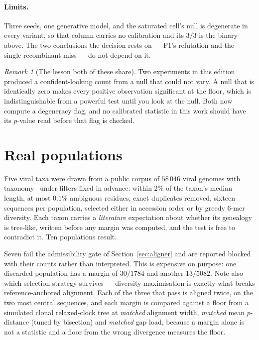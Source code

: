 \documentclass[11pt,a4paper]{article}
\theoremstyle{definition}
\theoremstyle{remark}
\newtheorem{remark}{Remark}[section]
\begin{document}
\paragraph{Limits.} Three seeds, one generative model, and the saturated cell's
null is degenerate in every variant, so that column carries no calibration and
its $3/3$ is the binary above. The two conclusions the decision rests on --- F1's
refutation and the single-recombinant miss --- do not depend on it.

\begin{remark}[The lesson both of these share]
Two experiments in this edition produced a confident-looking count from a null
that could not vary. A null that is identically zero makes every positive
observation significant at the floor, which is indistinguishable from a powerful
test until you look at the null. Both now compute a degeneracy flag, and no
calibrated statistic in this work should have its $p$-value read before that flag
is checked.
\end{remark}

\section{Real populations}\label{sec:real}

Five viral taxa were drawn from a public corpus of $58\,046$ viral genomes with
taxonomy~\cite{vhg} under filters fixed in advance: within $2\%$ of the taxon's
median length, at most $0.1\%$ ambiguous residues, exact duplicates removed,
sixteen sequences per population, selected either in accession order or by greedy
$6$-mer diversity. Each taxon carries a \emph{literature} expectation about
whether its genealogy is tree-like, written before any margin was computed, and
the test is free to contradict it. Ten populations result.

Seven fail the admissibility gate of Section~\ref{sec:aligner} and are reported
blocked with their counts rather than interpreted. This is expensive on purpose:
one discarded population has a margin of $30/1784$ and another $13/5082$. Note
also which selection strategy survives --- diversity maximisation is exactly what
breaks reference-anchored alignment. Each of the three that pass is aligned twice,
on the two most central sequences, and each margin is compared against a floor
from a simulated clonal relaxed-clock tree at \emph{matched} alignment width,
\emph{matched} mean $p$-distance (tuned by bisection) and \emph{matched} gap
load, because a margin alone is not a statistic and a floor from the wrong
divergence measures the floor.
\end{document}
